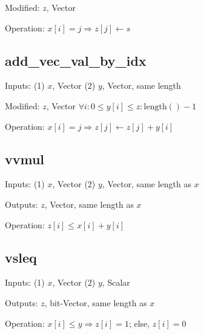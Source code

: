 \item Modified: \(z\), Vector

\item Operation: \(x[i] = j \Rightarrow z[j] \leftarrow s\)
\ei

\subsection{add\_vec\_val\_by\_idx}
\label{add_vec_val_by_idx}
\bi
\item Inputs: (1) \(x\), Vector  (2) \(y\), Vector, same length

\item Modified: \(z\), Vector \(\forall i: 0 \leq y[i] \leq z:\mathrm{length}() - 1\)

\item Operation: \(x[i] = j \Rightarrow z[j] \leftarrow z[j] + y[i]\)
\ei


\subsection{vvmul}
\label{vvmul}
\bi
\item Inputs: (1) \(x\), Vector  (2) \(y\), Vector, same length as \(x\)

\item Outputs: \(z\), Vector, same length as \(x\)

\item Operation: \(z[i] \leq x[i] + y[i]\)
\ei

\subsection{vsleq}
\label{vsleq}
\bi
\item Inputs: (1) \(x\), Vector  (2) \(y\), Scalar

\item Outputs: \(z\), bit-Vector, same length as \(x\)

\item Operation: \(x[i] \leq y \Rightarrow z[i] = 1\); else, \(z[i] = 0\)
\ei



